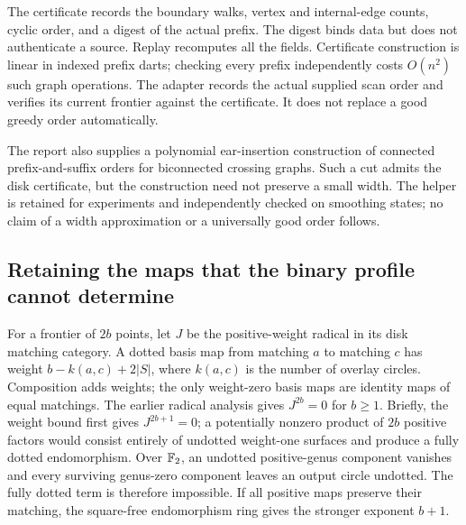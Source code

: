 The certificate records the boundary walks, vertex and internal-edge counts,
cyclic order, and a digest of the actual prefix. The digest binds data but
does not authenticate a source. Replay recomputes all the fields. Certificate
construction is linear in indexed prefix darts; checking every prefix
independently costs $O(n^2)$ such graph operations. The adapter records the
actual supplied scan order and verifies its current frontier against the
certificate. It does not replace a good greedy order automatically.

The report also supplies a polynomial ear-insertion construction of connected
prefix-and-suffix orders for biconnected crossing graphs. Such a cut admits
the disk certificate, but the construction need not preserve a small width.
The helper is retained for experiments and independently checked on smoothing
states; no claim of a width approximation or a universally good order follows.

\subsection{Retaining the maps that the binary profile cannot determine}
For a frontier of $2b$ points, let $J$ be the positive-weight radical in its
disk matching category. A dotted basis map from matching $a$ to matching $c$
has weight $b-k(a,c)+2|S|$, where $k(a,c)$ is the number of overlay circles.
Composition adds weights; the only weight-zero basis maps are identity maps
of equal matchings. The earlier radical analysis gives $J^{2b}=0$ for
$b\ge1$. Briefly, the weight bound first gives $J^{2b+1}=0$; a potentially
nonzero product of $2b$ positive factors would consist entirely of undotted
weight-one surfaces and produce a fully dotted endomorphism. Over $\mathbb{F}_2$, an
undotted positive-genus component vanishes and every surviving genus-zero
component leaves an output circle undotted. The fully dotted term is
therefore impossible. If all positive maps preserve their matching, the
square-free endomorphism ring gives the stronger exponent $b+1$.

